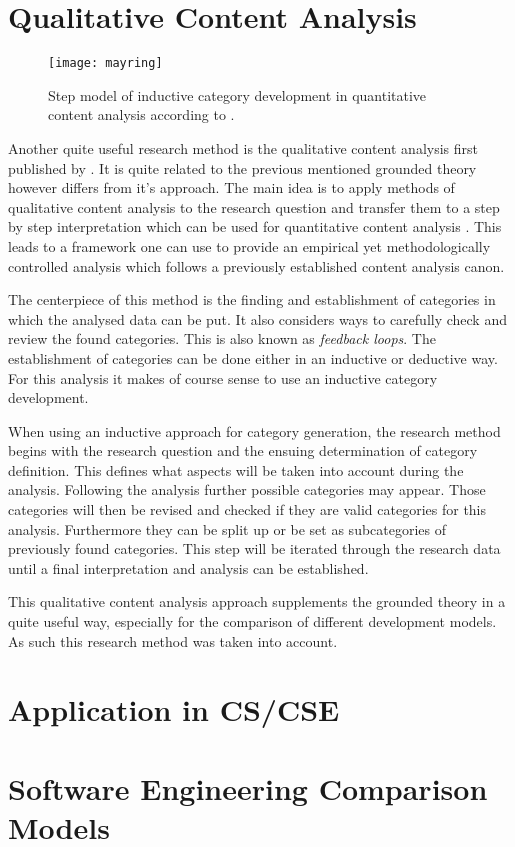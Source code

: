 
\section{Qualitative Content Analysis} %

\begin{figure}[htbp]
  \centering
  \texttt{[image: mayring]}
  \caption{Step model of inductive category development in quantitative content
    analysis according to \citeauthor{Mayring2008} \cite{Mayring2000,Mayring2008}.}
\end{figure}

Another quite useful research method is the qualitative content analysis first
published by \textcite{Mayring2008}. It is quite related to the previous
mentioned grounded theory however differs from it's approach. The main idea is
to apply methods of qualitative content analysis to the research question and
transfer them to a step by step interpretation which can be used for
quantitative content analysis \cite{Mayring2000}. This leads to a framework one
can use to provide an empirical yet methodologically controlled analysis which
follows a previously established content analysis canon.

The centerpiece of this method is the finding and establishment of categories
in which the analysed data can be put. It also considers ways to carefully
check and review the found categories. This is also known as \emph{feedback
loops}. The establishment of categories can be done either in an inductive or
deductive way. For this analysis it makes of course sense to use an inductive
category development.

When using an inductive approach for category generation, the research method
begins with the research question and the ensuing determination of category
definition. This defines what aspects will be taken into account during the
analysis. Following the analysis further possible categories may appear. Those
categories will then be revised and checked if they are valid categories for
this analysis. Furthermore they can be split up or be set as subcategories of
previously found categories. This step will be iterated through the research
data until a final interpretation and analysis can be established.

This qualitative content analysis approach supplements the grounded theory in a
quite useful way, especially for the comparison of different development
models. As such this research method was taken into account.


\section{Application in CS/CSE} %


\section{Software Engineering Comparison Models} %



